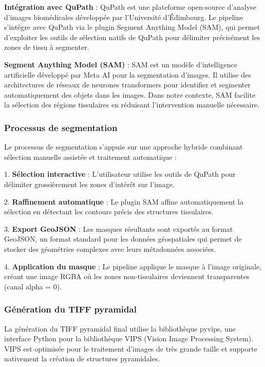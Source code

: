 \documentclass[12pt,a4paper]{report}
\begin{document}
\textbf{Intégration avec QuPath} : QuPath est une plateforme open-source d'analyse d'images biomédicales développée par l'Université d'Édimbourg. Le pipeline s'intègre avec QuPath via le plugin Segment Anything Model (SAM), qui permet d'exploiter les outils de sélection natifs de QuPath pour délimiter précisément les zones de tissu à segmenter.

\textbf{Segment Anything Model (SAM)} : SAM est un modèle d'intelligence artificielle développé par Meta AI pour la segmentation d'images. Il utilise des architectures de réseaux de neurones transformers pour identifier et segmenter automatiquement des objets dans les images. Dans notre contexte, SAM facilite la sélection des régions tissulaires en réduisant l'intervention manuelle nécessaire.

\subsubsection{Processus de segmentation}

Le processus de segmentation s'appuie sur une approche hybride combinant sélection manuelle assistée et traitement automatique :

1. \textbf{Sélection interactive} : L'utilisateur utilise les outils de QuPath pour délimiter grossièrement les zones d'intérêt sur l'image.

2. \textbf{Raffinement automatique} : Le plugin SAM affine automatiquement la sélection en détectant les contours précis des structures tissulaires.

3. \textbf{Export GeoJSON} : Les masques résultants sont exportés au format GeoJSON, un format standard pour les données géospatiales qui permet de stocker des géométries complexes avec leurs métadonnées associées.

4. \textbf{Application du masque} : Le pipeline applique le masque à l'image originale, créant une image RGBA où les zones non-tissulaires deviennent transparentes (canal alpha = 0).

\subsubsection{Génération du TIFF pyramidal}

La génération du TIFF pyramidal final utilise la bibliothèque pyvips, une interface Python pour la bibliothèque VIPS (Vision Image Processing System). VIPS est optimisée pour le traitement d'images de très grande taille et supporte nativement la création de structures pyramidales.
\end{document}

